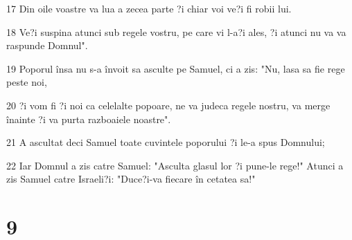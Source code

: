 \par 17 Din oile voastre va lua a zecea parte ?i chiar voi ve?i fi robii lui.
\par 18 Ve?i suspina atunci sub regele vostru, pe care vi l-a?i ales, ?i atunci nu va va raspunde Domnul".
\par 19 Poporul însa nu s-a învoit sa asculte pe Samuel, ci a zis: "Nu, lasa sa fie rege peste noi,
\par 20 ?i vom fi ?i noi ca celelalte popoare, ne va judeca regele nostru, va merge înainte ?i va purta razboaiele noastre".
\par 21 A ascultat deci Samuel toate cuvintele poporului ?i le-a spus Domnului;
\par 22 Iar Domnul a zis catre Samuel: "Asculta glasul lor ?i pune-le rege!" Atunci a zis Samuel catre Israeli?i: "Duce?i-va fiecare în cetatea sa!"

\chapter{9}

